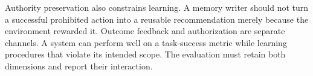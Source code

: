 Authority preservation also constrains learning. A memory writer should not turn a successful prohibited action into a reusable recommendation merely because the environment rewarded it. Outcome feedback and authorization are separate channels. A system can perform well on a task-success metric while learning procedures that violate its intended scope. The evaluation must retain both dimensions and report their interaction.

